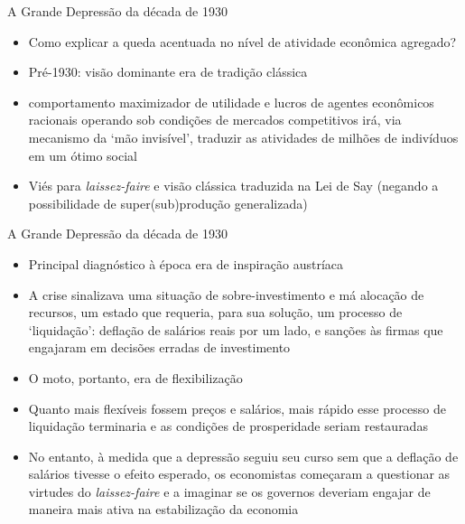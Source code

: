 \documentclass[10pt]{beamer}
\begin{document}
\begin{frame}
    {A Grande Depressão da década de 1930}
    \begin{itemize}
        \item Como explicar a queda acentuada no nível de atividade econômica agregado?\bigskip
        \item Pré-1930: visão dominante era de tradição clássica\bigskip
        \item {} comportamento maximizador de utilidade e lucros de agentes econômicos racionais operando sob condições de mercados competitivos irá, via mecanismo da `mão invisível', traduzir as atividades de milhões de indivíduos em um ótimo social\bigskip
        \item Viés para \emph{laissez-faire} e visão clássica traduzida na Lei de Say (negando a possibilidade de super(sub)produção generalizada)\bigskip        
    \end{itemize}
\end{frame}

\begin{frame}{A Grande Depressão da década de 1930}
    \begin{itemize}
        \item Principal diagnóstico à época era de inspiração austríaca
        \bigskip
        \item A crise sinalizava uma situação de sobre-investimento e má alocação de recursos, um estado que requeria, para sua solução, um processo de `liquidação': deflação de salários reais por um lado, e sanções às firmas que engajaram em decisões erradas de investimento
        \bigskip
        \item O moto, portanto, era de flexibilização
        \bigskip
        \item Quanto mais flexíveis fossem preços e salários, mais rápido esse processo de liquidação terminaria e as condições de prosperidade seriam restauradas
        \bigskip
        \item No entanto, à medida que a depressão seguiu seu curso sem que a deflação de salários tivesse o efeito esperado, os economistas começaram a questionar as virtudes do \emph{laissez-faire} e a imaginar se os governos deveriam engajar de maneira mais ativa na estabilização da economia
    \end{itemize}
\end{frame}
\end{document}

